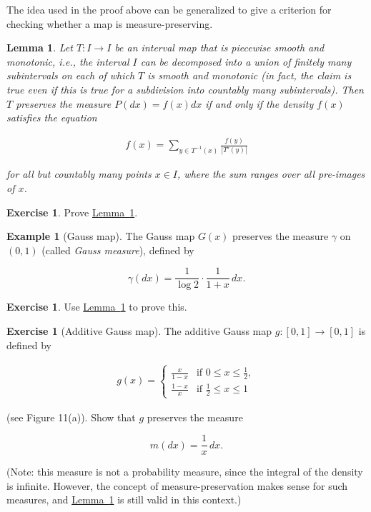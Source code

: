 \documentclass[11pt]{report}
\theoremstyle{plain}
\newtheorem{lem}[thm]{Lemma}
\theoremstyle{definition}
\newtheorem{example}[thm]{Example}
\newtheorem{xexercise}[thm]{Exercise}
\begin{document}
\noindent The idea used in the proof above can be generalized to
give a criterion for checking whether a map is
measure-preserving.

\begin{lem}
\label{lem:measure-pres}
Let $T:I\to I$ be an interval map that is piecewise
smooth and monotonic, i.e., the interval $I$ can be
decomposed into a union of finitely many subintervals
on each of which $T$ is smooth and monotonic (in fact,
the claim is true even if this is true for a
subdivision into countably many subintervals). Then
$T$ preserves the measure $P(dx)=f(x)dx$ if and only
if the density $f(x)$ satisfies the equation

\begin{align*}
f(x) = \sum_{y\in T^{-1}(x)} \frac{f(y)}{|T'(y)|}
\end{align*}

\noindent for all but countably many points $x\in I$, where the
sum ranges over all pre-images of $x$.
\end{lem}

\begin{xexercise}
Prove \hyperref[lem:measure-pres]{Lemma~\ref*{lem:measure-pres}}.
\end{xexercise}

\begin{example}[Gauss map]
The Gauss map $G(x)$ preserves the measure $\gamma$ on
$(0,1)$ (called \emph{Gauss measure}), defined by

\[
\gamma(dx) = \frac{1}{\log 2}\cdot \frac{1}{1+x}\,dx.
\]

\end{example}

\begin{xexercise}
Use \hyperref[lem:measure-pres]{Lemma~\ref*{lem:measure-pres}} to prove this.
\end{xexercise}

\begin{xexercise}[Additive Gauss map]
The additive Gauss map $g:[0,1]\to[0,1]$ is defined by

\begin{align*}
g(x) = \begin{cases} \frac{x}{1-x} & \textrm{if }0\le x\le \tfrac12, \\
\frac{1-x}{x}&\textrm{if }\tfrac12\le x\le 1
\end{cases}
\end{align*}

\noindent (see Figure 11(a)). Show that $g$ preserves the
measure

\[
m(dx)=\frac{1}{x}\,dx.
\]

\noindent (Note: this measure is not a probability measure,
since the integral of the density is infinite.
However, the concept of measure-preservation makes
sense for such measures, and \hyperref[lem:measure-pres]{Lemma~\ref*{lem:measure-pres}}
is still valid in this context.)
\end{xexercise}
\end{document}
